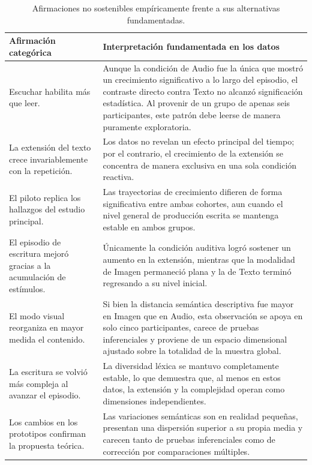 \documentclass[12pt]{article}
\begin{document}
	\begin{table}[H]
		\centering
		\caption{Afirmaciones no sostenibles empíricamente frente a sus alternativas fundamentadas.}
		\label{tab:no_sostener}
		\small
		\begin{tabular}{p{} p{}}
			\toprule
			\textbf{Afirmación categórica} & \textbf{Interpretación fundamentada en los datos} \\
			\midrule
			Escuchar habilita más que leer. &
			Aunque la condición de Audio fue la única que mostró un crecimiento significativo a lo largo del episodio, el contraste directo contra Texto no alcanzó significación estadística. Al provenir de un grupo de apenas seis participantes, este patrón debe leerse de manera puramente exploratoria. \\[4pt]
			La extensión del texto crece invariablemente con la repetición. &
			Los datos no revelan un efecto principal del tiempo; por el contrario, el crecimiento de la extensión se concentra de manera exclusiva en una sola condición reactiva. \\[4pt]
			El piloto replica los hallazgos del estudio principal. &
			Las trayectorias de crecimiento difieren de forma significativa entre ambas cohortes, aun cuando el nivel general de producción escrita se mantenga estable en ambos grupos. \\[4pt]
			El episodio de escritura mejoró gracias a la acumulación de estímulos. &
			Únicamente la condición auditiva logró sostener un aumento en la extensión, mientras que la modalidad de Imagen permaneció plana y la de Texto terminó regresando a su nivel inicial. \\[4pt]
			El modo visual reorganiza en mayor medida el contenido. &
			Si bien la distancia semántica descriptiva fue mayor en Imagen que en Audio, esta observación se apoya en solo cinco participantes, carece de pruebas inferenciales y proviene de un espacio dimensional ajustado sobre la totalidad de la muestra global. \\[4pt]
			La escritura se volvió más compleja al avanzar el episodio. &
			La diversidad léxica se mantuvo completamente estable, lo que demuestra que, al menos en estos datos, la extensión y la complejidad operan como dimensiones independientes. \\[4pt]
			Los cambios en los prototipos confirman la propuesta teórica. &
			Las variaciones semánticas son en realidad pequeñas, presentan una dispersión superior a su propia media y carecen tanto de pruebas inferenciales como de corrección por comparaciones múltiples. \\
			\bottomrule
		\end{tabular}
	\end{table}
	
\end{document}
